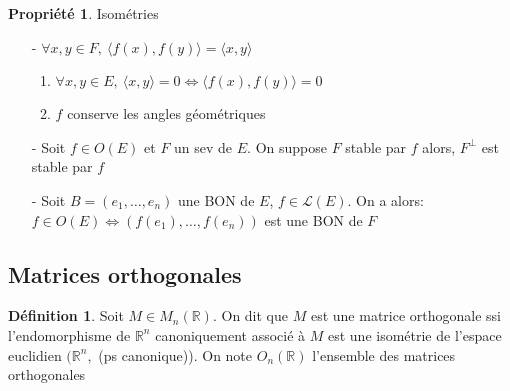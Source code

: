 \documentclass[fleqn]{article}
\theoremstyle{definition} \newtheorem*{defi}{D\'efinition}
\theoremstyle{definition} \newtheorem*{theo}{Th\'eor\`eme}
\theoremstyle{definition} \newtheorem*{coro}{Corollaire}
\theoremstyle{remark} \newtheorem*{rqs}{Remarques}
\theoremstyle{definition} \newtheorem*{prop}{Propri\'et\'e}
\begin{document}
\begin{prop} Isom\'etries
	\begin{enumerate}
		\item [-] $\forall x,y \in F,\ \langle f(x), f(y) \rangle = \langle x,y \rangle$
			\begin{enumerate}
				\item $\forall x,y \in E,\ \langle x,y \rangle = 0 \Leftrightarrow \langle f(x), f(y) \rangle = 0$
				\item $f$ conserve les angles g\'eom\'etriques
			\end{enumerate}
		\item [-] Soit $f \in O(E)$ et $F$ un sev de $E$. On suppose $F$ stable par $f$ alors, $F^\perp$ est stable par $f$
		\item [-] Soit $B = (e_1, \hdots, e_n)$ une BON de $E$, $f \in \mathscr{L}(E)$. On a alors:\\
			$f \in O(E) \Leftrightarrow (f(e_1), \hdots, f(e_n))$ est une BON de $F$
	\end{enumerate}
\end{prop}

\subsection{Matrices orthogonales}
\begin{defi} Soit $M \in M_n(\mathbb{R})$. On dit que $M$ est une matrice orthogonale ssi l'endomorphisme de $\mathbb{R}^n$ canoniquement
associ\'e \`a $M$ est une isom\'etrie de l'espace euclidien $(\mathbb{R}^n,$ (ps canonique)). On note $O_n(\mathbb{R})$ l'ensemble des matrices
orthogonales
\end{defi}
\end{document}
